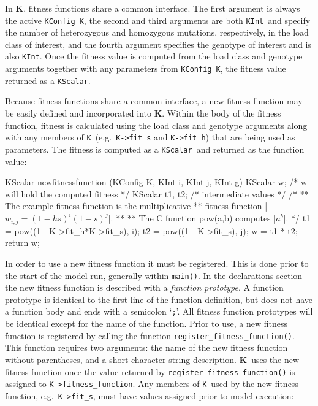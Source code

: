 \documentclass[12pt,twoside,letterpaper,fleqn]{report}
\numberwithin{equation}{section}  %
\newcommand{\K}{{\bf K}}
\newcommand{\KK}{\mbox{{\tt K}}}  %
\newcommand{\KScalar}{\mbox{\tt KScalar}}
\newcommand{\KInt}{\mbox{\tt KInt}}
\newcommand{\KConfig}{\mbox{\tt KConfig}}
\begin{document}
{In \K, fitness functions share a common interface.  The first argument is always the active \KConfig\ \KK, the second and third arguments are both \KInt\ and specify the number of heterozygous and homozygous mutations, respectively, in the load class of interest, and the fourth argument specifies the genotype of interest and is also \KInt.  Once the fitness value is computed from the load class and genotype arguments together with any parameters from \KConfig\ \KK, the fitness value returned as a \KScalar.

Because fitness functions share a common interface, a new fitness function may be easily defined and incorporated into \K.
Within the body of the fitness function, fitness is calculated using the load class and genotype arguments along with any members of \KK\ (e.g.\ \lstinline{K->fit_s} and \lstinline{K->fit_h}) that are being used as parameters.  The fitness is computed as a \KScalar\ and returned as the function value:
\begin{C}[gobble=4,mathescape=true,escapechar=|]
    KScalar  newfitnessfunction  (KConfig K, KInt i, KInt j, KInt g)
    {
        KScalar w;       /* w will hold the computed fitness */
        KScalar t1, t2;  /* intermediate values */
        /*
        ** The example fitness function is the multiplicative
        ** fitness function |$w_{i,j}=(1-hs)^{i}(1-s)^{j}$|.
        **
        ** The C function pow(a,b) computes |$a^b$|.
        */
        t1 = pow((1 - K->fit_h*K->fit_s), i);
        t2 = pow((1 - K->fit_s), j);
        w = t1 * t2;
        return w;
    }
\end{C}
In order to use a new fitness function it must be registered.  This is done prior to the start of the model run, generally within \lstinline{main()}.  In the declarations section the new fitness function is described with a {\em function prototype}.  A function prototype is identical to the first line of the function definition, but does not have a function body and ends with a semicolon `\lstinline{;}'.  All fitness function prototypes will be identical except for the name of the function.  Prior to use, a new fitness function is registered by calling the function \lstinline{register_fitness_function()}.  This function requires two arguments: the name of the new fitness function without parentheses, and a short character-string description.  \K\ uses the new fitness function once the value returned by \lstinline{register_fitness_function()} is assigned to \lstinline{K->fitness_function}.  Any members of \KK\ used by the new fitness function, e.g.\  \lstinline{K->fit_s}, must have values assigned prior to model execution:
}
\end{document}
